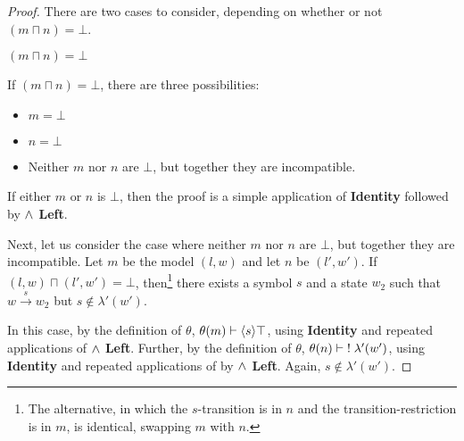 \begin{proof}

There are two cases to consider, depending on whether or not $(m \sqcap n) = \bot$.

\setcounter{mycase}{0}

\begin{mycase}
$(m \sqcap n) = \bot$
\end{mycase}
If $(m \sqcap n) = \bot$, there are three possibilities:
\begin{itemize}
\item
$m = \bot$
\item
$n = \bot$
\item
Neither $m$ nor $n$ are $\bot$, but together they are incompatible. 
\end{itemize}
If either $m$ or $n$ is $\bot$, then the proof is a simple application of {\bf Identity} followed by {\bf $\land$ Left}.

Next, let us consider the case where neither $m$ nor $n$ are $\bot$, but together they are incompatible.
Let $m$ be the  model $(l, w)$ and let $n$ be $(l', w')$.
If $(l, w) \sqcap (l', w') = \bot$, then\footnote{The alternative, in which the $s$-transition is in $n$ and the transition-restriction is in $m$, is identical, swapping $m$ with $n$.} there exists a symbol $s$ and a state $w_2$ such that $w \xrightarrow{s} w_2$ but $s \notin \lambda'(w')$.

In this case, by the definition of $\theta$, $\theta(m) \vdash \langle s \rangle \top$, using  {\bf Identity} and repeated applications of {\bf $\land$ Left}.
Further, by the definition of $\theta$, $\theta(n) \vdash \; ! \; \lambda'(w')$, using  {\bf Identity} and repeated applications of by {\bf $\land$ Left}. Again, $s \notin  \lambda'(w')$.


\end{proof}
